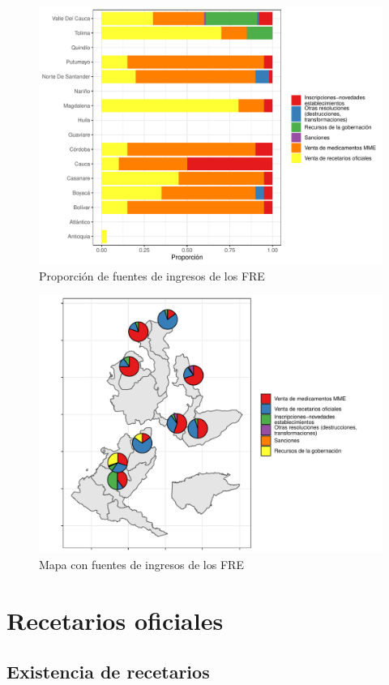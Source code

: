 \documentclass[
]{book}
\begin{document}
\begin{figure}
\includegraphics[width=0.85\linewidth]{InformeFinal_files/figure-latex/IngresosFRE1-1} \caption{Proporción de fuentes de ingresos de los FRE}\label{fig:IngresosFRE1}
\end{figure}
\begin{figure}
\includegraphics[width=0.85\linewidth]{InformeFinal_files/figure-latex/IngresosFRE2-1} \caption{Mapa con fuentes de ingresos de los FRE}\label{fig:IngresosFRE2}
\end{figure}

\hypertarget{recetarios-oficiales}{%
\chapter{Recetarios oficiales}\label{recetarios-oficiales}}


\hypertarget{existencia-de-recetarios}{%
\section{Existencia de recetarios}\label{existencia-de-recetarios}}
\end{document}
